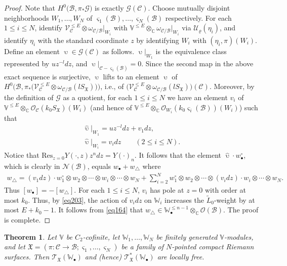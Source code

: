 \documentclass[12pt,b5paper,notitlepage]{report}
\theoremstyle{definition}
\theoremstyle{plain}
\newtheorem{thm}[df]{Theorem}
\newcommand{\fk}{\mathfrak}
\newcommand{\mc}{\mathcal}
\newcommand{\wtd}{\widetilde}
\newcommand{\wht}{\widehat}
\newcommand{\Res}{\mathrm{Res}}
\newcommand{\scr}{\mathscr}
\newcommand{\sgm}{\varsigma}
\newcommand{\blt}{\bullet}
\newcommand{\Vbb}{\mathbb V}
\newcommand{\Wbb}{\mathbb W}
\newcommand{\Cbb}{\mathbb C}
\numberwithin{equation}{section}
\begin{document}
\begin{proof}
Note that $H^0\big(\mc B,\pi_*\scr G\big)$ is exactly $\scr G(\mc C)$. Choose mutually disjoint neighborhoods $W_1,\dots,W_N$ of $\sgm_1(\mc B),\dots,\sgm_N(\mc B)$ respectively. For each $1\leq i\leq N$, identify $\scr V_{\mc C}^{\leq E}\otimes\omega_{\mc C/\mc B}|_{W_i}$ with $\Vbb^{\leq E}\otimes_\Cbb\omega_{\mc C/\mc B}|_{W_i}$ via $\mc U_\varrho(\eta_i)$, and identify $\eta_i$ with the standard coordinate $z$ by identifying $W_i$ with $(\eta_i,\pi)(W_i)$. Define an element $\upupsilon\in\scr G(\mc C)$ as follows. $\upupsilon|_{W_1}$ is the equivalence class represented by $uz^{-l}dz$, and $\upupsilon|_{\mc C-\sgm_1(\mc B)}=0$. Since the second map in the above exact sequence is surjective, $\upupsilon$ lifts to an element $\wht\upupsilon$ of $H^0\big(\mc B,\pi_*\big(\scr V_{\mc C}^{\leq E}\otimes\omega_{\mc C/\mc B}(lS_{\fk X})\big)\big)$, i.e., of $\big(\scr V_{\mc C}^{\leq E}\otimes\omega_{\mc C/\mc B}(lS_{\fk X})\big)(\mc C)$. Moreover, by the definition of $\scr G$ as a quotient, for each $1\leq i\leq N$ we have an element $v_i$ of $\Vbb^{\leq E}\otimes_\Cbb\scr O_{\mc C}(k_0 S_{\fk X})(W_i)$ (and hence of $\Vbb^{\leq E}\otimes_\Cbb\scr O_{W_i}(k_0 \sgm_i(\mc B))(W_i)$) such that
\begin{gather*}
\wht\upupsilon|_{W_1}=uz^{-l}dz+v_1dz,\\
\wht\upupsilon|_{W_i}=v_idz\qquad(2\leq i\leq N).
\end{gather*}
Notice that $\Res_{z=0}Y(\cdot,z)z^ndz=Y(\cdot)_n$. It follows that the element $\wht\upupsilon\cdot w_\blt^\circ$, which is clearly in $\scr N(\mc B)$,  equals $w_\blt+w_\triangle$ where
\begin{align*}
w_\triangle=(v_1dz)\cdot w_1^\circ\otimes w_2\otimes\cdots \otimes  w_i\otimes\cdots\otimes w_N+\sum_{i=2}^Nw_1^\circ\otimes w_2\otimes\cdots \otimes (v_idz)\cdot w_i\otimes\cdots\otimes w_N.
\end{align*}
Thus $[w_\blt]=-[w_\triangle]$. For each $1\leq i\leq N$, $v_i$ has pole at $z=0$ with order at most $k_0$. Thus, by \eqref{eq203}, the action of $v_idz$ on $\Wbb_i$ increases the $\wtd L_0$-weight by at most $E+k_0-1$. It follows from \eqref{eq164} that $w_\triangle\in\Wbb_\blt^{\leq {n-1}}\otimes_\Cbb\scr O(\mc B)$. The proof is complete.
\end{proof}


\begin{thm}\label{lb68}
Let $\Vbb$ be $C_2$-cofinite, let $\Wbb_1,\dots,\Wbb_N$ be finitely generated $\Vbb$-modules, and let $\fk X=(\pi:\mc C\rightarrow\mc B;\sgm_1,\dots,\sgm_N)$ be a family of $N$-pointed compact Riemann surfaces. Then $\scr T_{\fk X}(\Wbb_\blt)$ and (hence) $\scr T_{\fk X}^*(\Wbb_\blt)$ are locally free. 
\end{thm}
\end{document}
